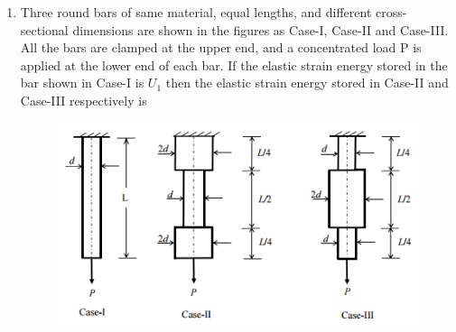 \documentclass[a4paper,10pt]{article}
\begin{document}
\begin{enumerate}
    \item Three round bars of same material, equal lengths, and different cross-sectional dimensions are shown in the figures as Case-I, Case-II and Case-III. All the bars are clamped at the upper end, and a concentrated load P is applied at the lower end of each bar. If the elastic strain energy stored in the bar shown in Case-I is $U_1$ then the elastic strain energy stored in Case-II and Case-III respectively is
    \begin{figure}[H] \centering \includegraphics[width=\columnwidth]{q12_solid.png} \caption*{} \label{fig:q12_solid} \end{figure}
    \hfill{}
    \begin{enumerate}[label=\Alph*)]
    \end{enumerate}


\end{enumerate}
\end{document}
